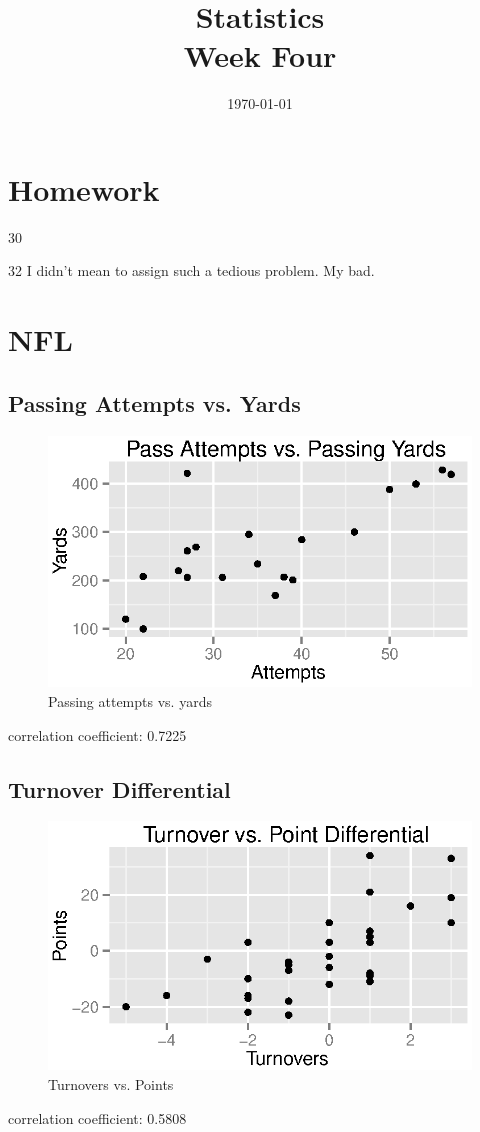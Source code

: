 \documentclass{exam}
\author{}
\title{Statistics \\ Week Four}
\date{\today}
\begin{document}
\maketitle
\tableofcontents

  \section{Homework}

  \begin{description*}
    \item[30]
    \item[32] I didn't mean to assign such a tedious problem.  My bad.
  \end{description*}

  \section{NFL}

  \subsection{Passing Attempts vs. Yards}

  \begin{figure}[H]
    \centering
    \includegraphics{figures/nfl/passing_attempts_vs_yds.eps}
    \caption{Passing attempts vs. yards}
  \end{figure}

  correlation coefficient: 0.7225

  \subsection{Turnover Differential}

  \begin{figure}[H]
    \centering
    \includegraphics{figures/nfl/to_vs_pts.eps}
    \caption{Turnovers vs. Points}
  \end{figure}

  correlation coefficient: 0.5808
\end{document}
